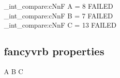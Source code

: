 \ExplSyntaxOn
\CDR_int_compare:cNnF { A } = 8 { FAILED \\ }
\CDR_int_compare:cNnF { B } = 7 { FAILED \\ }
\CDR_int_compare:cNnF { C } = 13 { FAILED \\ }
\ExplSyntaxOff

\subsection{\textsf{fancyvrb} properties}

\begin{CDRBlock} [
  tags=none,
  numbers=left,
  firstnumber=last,
]
A
B
C
\end{CDRBlock}

\egroup


